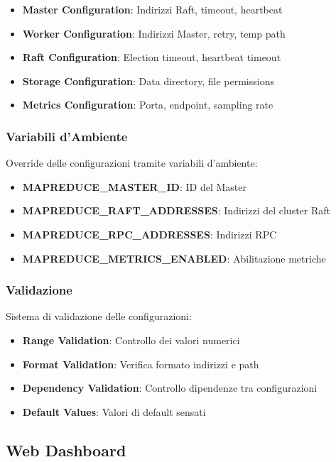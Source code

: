 \documentclass[12pt,a4paper]{article}
\begin{document}
\begin{itemize}
\item \textbf{Master Configuration}: Indirizzi Raft, timeout, heartbeat
\item \textbf{Worker Configuration}: Indirizzi Master, retry, temp path
\item \textbf{Raft Configuration}: Election timeout, heartbeat timeout
\item \textbf{Storage Configuration}: Data directory, file permissions
\item \textbf{Metrics Configuration}: Porta, endpoint, sampling rate
\end{itemize}

\subsubsection{Variabili d'Ambiente}

Override delle configurazioni tramite variabili d'ambiente:

\begin{itemize}
\item \textbf{MAPREDUCE\_MASTER\_ID}: ID del Master
\item \textbf{MAPREDUCE\_RAFT\_ADDRESSES}: Indirizzi del cluster Raft
\item \textbf{MAPREDUCE\_RPC\_ADDRESSES}: Indirizzi RPC
\item \textbf{MAPREDUCE\_METRICS\_ENABLED}: Abilitazione metriche
\end{itemize}

\subsubsection{Validazione}

Sistema di validazione delle configurazioni:

\begin{itemize}
\item \textbf{Range Validation}: Controllo dei valori numerici
\item \textbf{Format Validation}: Verifica formato indirizzi e path
\item \textbf{Dependency Validation}: Controllo dipendenze tra configurazioni
\item \textbf{Default Values}: Valori di default sensati
\end{itemize}

\subsection{Web Dashboard}
\end{document}
